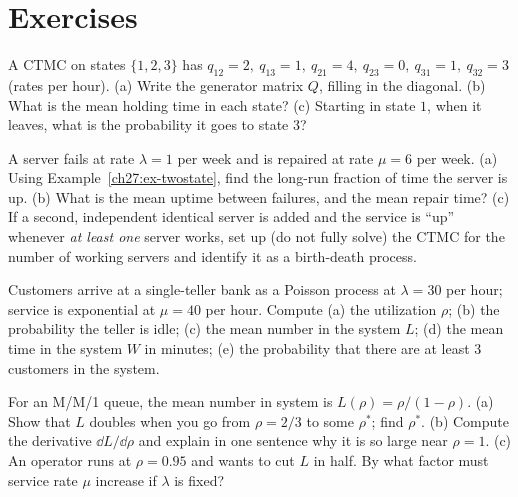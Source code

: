 \section{Exercises}
\label{ch27:exercises}

\begin{exercise}
\label{ch27:exr-readgen}
A CTMC on states $\{1,2,3\}$ has $q_{12}=2,\ q_{13}=1,\ q_{21}=4,\ q_{23}=0,\ q_{31}=1,\ q_{32}=3$
(rates per hour). (a) Write the generator matrix $Q$, filling in the diagonal. (b) What is the mean
holding time in each state? (c) Starting in state $1$, when it leaves, what is the probability it
goes to state $3$?
\end{exercise}

\begin{exercise}
\label{ch27:exr-availability}
A server fails at rate $\lambda = 1$ per week and is repaired at rate $\mu = 6$ per week. (a) Using
Example~\ref{ch27:ex-twostate}, find the long-run fraction of time the server is up. (b) What is the
mean uptime between failures, and the mean repair time? (c) If a second, independent identical server
is added and the service is ``up'' whenever \emph{at least one} server works, set up (do not fully
solve) the CTMC for the number of working servers and identify it as a birth-death process.
\end{exercise}

\begin{exercise}[M/M/1 numbers]
\label{ch27:exr-mm1numbers}
Customers arrive at a single-teller bank as a Poisson process at $\lambda = 30$ per hour; service is
exponential at $\mu = 40$ per hour. Compute (a) the utilization $\rho$; (b) the probability the
teller is idle; (c) the mean number in the system $L$; (d) the mean time in the system $W$ in
minutes; (e) the probability that there are at least $3$ customers in the system.
\end{exercise}

\begin{exercise}
\label{ch27:exr-cliff}
For an M/M/1 queue, the mean number in system is $L(\rho) = \rho/(1-\rho)$. (a) Show that $L$ doubles
when you go from $\rho = 2/3$ to some $\rho^*$; find $\rho^*$. (b) Compute the derivative
$\dd L/\dd\rho$ and explain in one sentence why it is so large near $\rho = 1$. (c) An operator runs
at $\rho = 0.95$ and wants to cut $L$ in half. By what factor must service rate $\mu$ increase if
$\lambda$ is fixed?
\end{exercise}

